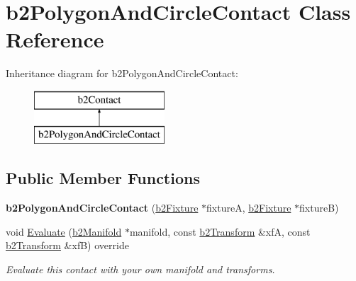 \hypertarget{classb2_polygon_and_circle_contact}{}\section{b2\+Polygon\+And\+Circle\+Contact Class Reference}
\label{classb2_polygon_and_circle_contact}
Inheritance diagram for b2\+Polygon\+And\+Circle\+Contact\+:\begin{figure}[H]
\begin{center}
\leavevmode
\includegraphics[height=2.000000cm]{classb2_polygon_and_circle_contact}
\end{center}
\end{figure}
\subsection*{Public Member Functions}
\begin{DoxyCompactItemize}
\item 
\mbox{\label{classb2_polygon_and_circle_contact_a38158da229eee22253c1f64df1982e40}} 
{\bfseries b2\+Polygon\+And\+Circle\+Contact} (\hyperlink{classb2_fixture}{b2\+Fixture} $\ast$fixtureA, \hyperlink{classb2_fixture}{b2\+Fixture} $\ast$fixtureB)
\item 
\mbox{\label{classb2_polygon_and_circle_contact_a4af8338f124be0b7ec704997be4736b1}} 
void \hyperlink{classb2_polygon_and_circle_contact_a4af8338f124be0b7ec704997be4736b1}{Evaluate} (\hyperlink{structb2_manifold}{b2\+Manifold} $\ast$manifold, const \hyperlink{structb2_transform}{b2\+Transform} \&xfA, const \hyperlink{structb2_transform}{b2\+Transform} \&xfB) override
\begin{DoxyCompactList}\small\item\em Evaluate this contact with your own manifold and transforms. \end{DoxyCompactList}\end{DoxyCompactItemize}
